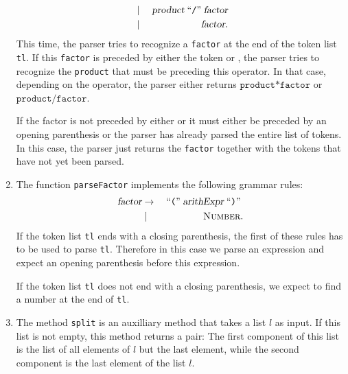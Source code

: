 \begin{enumerate}
\begin{eqnarray*}
                         & \mid        & \;\textsl{product} \;\mbox{``\texttt{/}''}\; \textsl{factor}\\
                         & \mid        & \;\textsl{factor}. 
      \end{eqnarray*}
      This time, the parser tries to recognize a \texttt{factor} at the end of the token
      list \texttt{tl}.  If this \texttt{factor} is preceded by either the token
      \squoted{*} or \squoted{/}, the parser tries to recognize the \texttt{product} that
      must be preceding this operator.  In that case, depending on the operator, the
      parser either returns $\mathtt{product} \mathtt{*} \mathtt{factor}$ or
      $\mathtt{product} / \mathtt{factor}$.
      
      If the factor is not preceded by either \squoted{*} or \squoted{/} it must either be preceded 
      by an opening parenthesis or the parser has already parsed the entire list of tokens.   In
      this case, the parser just returns the \texttt{factor} together with the tokens that have not
      yet been parsed.       
\item The function \texttt{parseFactor} implements the following grammar rules:
            \begin{eqnarray*}
        \textsl{factor}  & \rightarrow &   \;\mbox{``\texttt{(}''}\; \textsl{arithExpr} \;\mbox{``\texttt{)}''}\;        \\
                         & \mid        & \;\textsc{Number}. 
      \end{eqnarray*}
      If the token list \texttt{tl} ends with a closing parenthesis, the first of these rules has to
      be used to parse \texttt{tl}.  Therefore in this case we parse an expression and expect an
      opening parenthesis before this expression.

      If the token list \texttt{tl} does not end with a closing parenthesis, we expect to find a
      number at the end of \texttt{tl}.
\item The method \texttt{split} is an auxilliary method that takes a list $l$ as input.
      If this list is not empty, this method returns a pair:  The first component of this
      list is the list of all elements of $l$ but the last element, while the second
      component is the last element of the list $l$.
\end{enumerate}


